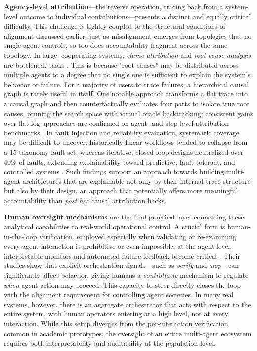 \documentclass[11pt,a4paper]{article}
\begin{document}
\textbf{Agency-level attribution}---the reverse operation, tracing back from a system-level outcome to individual contributions---presents a distinct and equally critical difficulty. This challenge is tightly coupled to the structural conditions of alignment discussed earlier: just as misalignment emerges from topologies that no single agent controls, so too does accountability fragment across the same topology. In large, cooperating systems, \emph{blame attribution} and \emph{root cause analysis} are bottleneck tasks \cite{arxiv:2601.09822v2}. This is because "root causes" may be distributed across multiple agents to a degree that no single one is sufficient to explain the system's behavior or failure. For a majority of users to trace failures, a hierarchical causal graph is rarely useful in itself. One notable approach transforms a flat trace into a causal graph and then counterfactually evaluates four parts to isolate true root causes, pruning the search space with virtual oracle backtracking; consistent gains over flat-log approaches are confirmed on agent- and step-level attribution benchmarks \cite{arxiv:2602.23701v1}. In fault injection and reliability evaluation, systematic coverage may be difficult to uncover: historically linear workflows tended to collapse from a 15-taxonomy fault set, whereas iterative, closed-loop designs neutralized over 40\% of faults, extending explainability toward predictive, fault-tolerant, and controlled systems \cite{arxiv:2602.19843v1}. Such findings support an approach towards building multi-agent architectures that are explainable not only by their internal trace structure but also by their design, an approach that potentially offers more meaningful accountability than \emph{post hoc} causal attribution hacks.

\textbf{Human oversight mechanisms} are the final practical layer connecting these analytical capabilities to real-world operational control. A crucial form is human-in-the-loop verification, employed especially when validating or re-examining every agent interaction is prohibitive or even impossible; at the agent level, interpretable monitors and automated failure feedback become critical \cite{arxiv:2603.19896v1}. Their studies show that explicit orchestration signals---such as \emph{verify} and \emph{stop}---can significantly affect behavior, giving humans a \emph{controllable} mechanism to regulate \emph{when} agent action may proceed. This capacity to steer directly closes the loop with the alignment requirement for controlling agent societies. In many real systems, however, there is an aggregate orchestrator that acts with respect to the entire system, with human operators entering at a high level, not at every interaction. While this setup diverges from the per-interaction verification common in academic prototypes, the oversight of an entire multi-agent ecosystem requires both interpretability and auditability at the population level.
\end{document}
